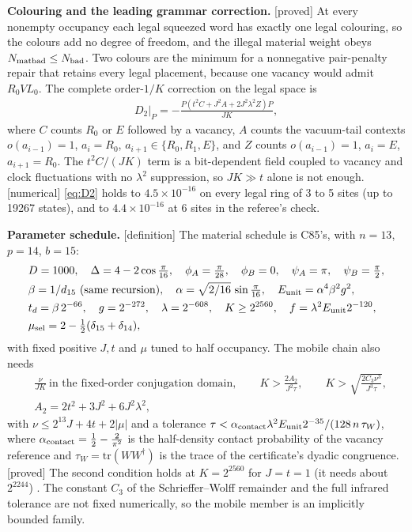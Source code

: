 \documentclass[11pt]{article}
\newcommand{\tg}[1]{\textsf{[#1]}}
\begin{document}
\textbf{Colouring and the leading grammar correction.} \tg{proved} At every nonempty occupancy each legal squeezed word has exactly one legal colouring, so the colours add no degree of freedom, and the illegal material weight obeys $N_{\rm matbad}\le N_{\rm bad}$. Two colours are the minimum for a nonnegative pair-penalty repair that retains every legal placement, because one vacancy would admit $R_0VL_0$. The complete order-$1/K$ correction on the legal space is
\begin{align}
D_2\big|_P=-\frac{P\left(t^2C+J^2A+2J^2\lambda^2Z\right)P}{JK},\label{eq:D2}
\end{align}
where $C$ counts $R_0$ or $E$ followed by a vacancy, $A$ counts the vacuum-tail contexts $o(a_{i-1})=1$, $a_i=R_0$, $a_{i+1}\in\{R_0,R_1,E\}$, and $Z$ counts $o(a_{i-1})=1$, $a_i=E$, $a_{i+1}=R_0$. The $t^2C/(JK)$ term is a bit-dependent field coupled to vacancy and clock fluctuations with no $\lambda^2$ suppression, so $JK\gg t$ alone is not enough. \tg{numerical} \eqref{eq:D2} holds to $4.5\times10^{-16}$ on every legal ring of 3 to 5 sites (up to 19267 states), and to $4.4\times10^{-16}$ at 6 sites in the referee's check.

\textbf{Parameter schedule.} \tg{definition} The material schedule is C85's, with $n=13$, $p=14$, $b=15$:
\begin{align}
&D=1000,\quad \Delta=4-2\cos\tfrac{\pi}{16},\quad \phi_A=\tfrac{\pi}{28},\quad \phi_B=0,\quad \psi_A=\pi,\quad \psi_B=\tfrac{\pi}{2},\nonumber\\
&\beta=1/d_{15}\ \text{(same recursion)},\quad \alpha=\sqrt{2/16}\,\sin\tfrac{\pi}{16},\quad E_{\rm unit}=\alpha^4\beta^2g^2,\nonumber\\
&t_d=\beta\,2^{-66},\quad g=2^{-272},\quad \lambda=2^{-608},\quad K\ge2^{2560},\quad f=\lambda^2E_{\rm unit}2^{-120},\nonumber\\
&\mu_{\rm sel}=2-\tfrac12(\delta_{15}+\delta_{14}),\label{eq:sched13}
\end{align}
with fixed positive $J,t$ and $\mu$ tuned to half occupancy. The mobile chain also needs
\begin{align}
&\frac{\nu}{JK}\ \text{in the fixed-order conjugation domain},\qquad K>\frac{2A_2}{J^2\tau},\qquad K>\sqrt{\frac{2C_3\nu^3}{J^3\tau}},\nonumber\\
&A_2=2t^2+3J^2+6J^2\lambda^2,\label{eq:Kmobile}
\end{align}
with $\nu\le2^{13}J+4t+2|\mu|$ and a tolerance $\tau<\alpha_{\rm contact}\lambda^2E_{\rm unit}2^{-35}/(128\,n\,\tau_W)$, where $\alpha_{\rm contact}=\frac12-\frac{2}{\pi^2}$ is the half-density contact probability of the vacancy reference and $\tau_W=\mathrm{tr}(WW^\dagger)$ is the trace of the certificate's dyadic congruence. \tg{proved} The second condition holds at $K=2^{2560}$ for $J=t=1$ (it needs about $2^{2244}$) \cite{refC88}. The constant $C_3$ of the Schrieffer--Wolff remainder \cite{bdl2011} and the full infrared tolerance are not fixed numerically, so the mobile member is an implicitly bounded family.
\end{document}
